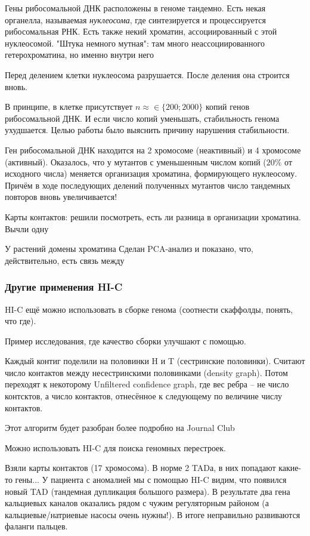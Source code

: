 \documentclass[main.tex]{subfiles}
\begin{document}
Гены рибосомальной ДНК расположены в геноме тандемно.
Есть некая органелла, называемая \emph{нуклеосома}, где синтезируется и процессируется рибосомальная РНК.
Есть также некий хроматин, ассоциированный с этой нуклеосомой.
"Штука немного мутная": там много неассоциированного гетерохроматина, но именно внутри него

Перед делением клетки нуклеосома разрушается.
После деления она строится вновь.

В принципе, в клетке присутствует $ n \approx \in \{200; 2000\} $ копий генов рибосомальной ДНК.
И если число копий уменьшать, стабильность генома ухудшается.
Целью работы было выяснить причину нарушения стабильности.

Ген рибосомальной ДНК находится на 2 хромосоме (неактивный) и 4 хромосоме (активный).
Оказалось, что у мутантов с уменьшенным числом копий ($ 20\% $ от исходного числа) меняется организация хроматина, формирующего нуклеосому.
Причём в ходе последующих делений полученных мутантов число тандемных повторов вновь увеличивается!

Карты контактов: решили посмотреть, есть ли разница в организации хроматина.
Вычли одну 

У растений домены хроматина %
Сделан PCA-анализ и показано, что, действительно, есть связь между 

\subsubsection{Другие применения HI-C}

HI-C ещё можно использовать в сборке генома (соотнести скаффолды, понять, что где).

Пример исследования, где качество сборки улучшают с помощью. %

Каждый контиг поделили на половинки H и T (сестринские половинки).
Считают число контактов между несестринскими половинками (density graph).
Потом переходят к некоторому Unfiltered confidence graph, где вес ребра -- не число контсктов, а число контактов, отнесённое к следующему по величине числу контактов.
\begin{leftbar}
Этот алгоритм будет разобран более подробно на Journal Club
\end{leftbar}

Можно использовать HI-C для поиска геномных перестроек.

Взяли карты контактов (17 хромосома).
В норме 2 TADа, в них попадают какие-то гены...
У пациента с аномалией мы с помощью HI-C видим, что появился новый TAD (тандемная дупликация большого размера).
В результате два гена кальциевых каналов оказались рядом с чужим регуляторным районом (а кальциевые/натриевые насосы очень нужны!).
В итоге неправильно развиваются фаланги пальцев.
\end{document}
